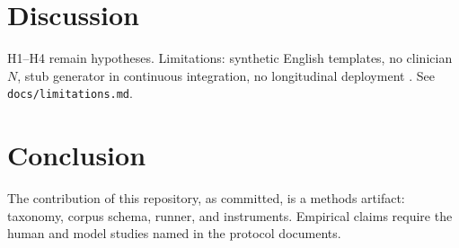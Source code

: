 \documentclass[11pt]{article}
\begin{document}
\section{Discussion}
H1--H4 remain hypotheses. Limitations: synthetic English templates, no clinician $N$, stub generator in continuous integration, no longitudinal deployment \citep{greenhalgh2017beyond}. See \texttt{docs/limitations.md}.

\section{Conclusion}
The contribution of this repository, as committed, is a methods artifact: taxonomy, corpus schema, runner, and instruments. Empirical claims require the human and model studies named in the protocol documents.



\end{document}
